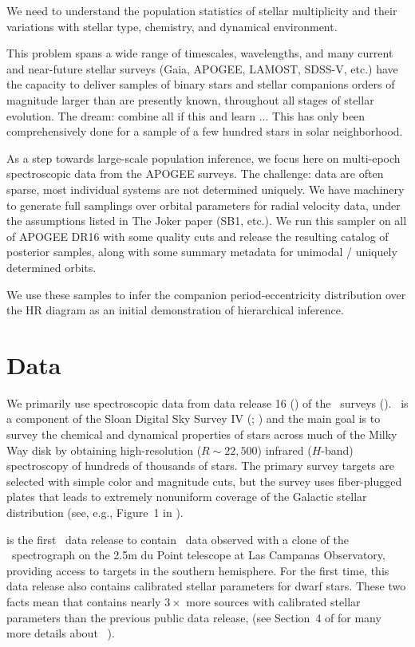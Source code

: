 \documentclass[modern]{aastex62}
\begin{document}
We need to understand the population statistics of stellar multiplicity and their variations with stellar type, chemistry, and dynamical environment.

This problem spans a wide range of timescales, wavelengths, and many current and near-future stellar surveys (Gaia, APOGEE, LAMOST, SDSS-V, etc.) have the capacity to deliver samples of binary stars and stellar companions orders of magnitude larger than are presently known, throughout all stages of stellar evolution.
The dream: combine all if this and learn ...
This has only been comprehensively done for a sample of a few hundred stars in solar neighborhood.

As a step towards large-scale population inference, we focus here on multi-epoch spectroscopic data from the APOGEE surveys.
The challenge: data are often sparse, most individual systems are not determined uniquely.
We have machinery to generate full samplings over orbital parameters for radial velocity data, under the assumptions listed in The Joker paper (SB1, etc.).
We run this sampler on all of APOGEE DR16 with some quality cuts and release the resulting catalog of posterior samples, along with some summary metadata for unimodal / uniquely determined orbits.

We use these samples to infer the companion period-eccentricity distribution over the HR diagram as an initial demonstration of hierarchical inference.


\section{Data} \label{sec:data}

We primarily use spectroscopic data from data release 16 () of the
\apogee\ surveys (\citealt{Majewski:2017, Abolfathi:2017, DR16}).
\apogee\ is a component of the Sloan Digital Sky Survey IV (\sdssiv;
\citealt{Gunn:2006, Blanton:2017}) and the main goal is to survey the chemical
and dynamical properties of stars across much of the Milky Way disk by obtaining
high-resolution ($R \sim 22,500$) infrared ($H$-band) spectroscopy of hundreds
of thousands of stars.
The primary survey targets are selected with simple color and magnitude cuts,
but the survey uses fiber-plugged plates that leads to extremely nonuniform
coverage of the Galactic stellar distribution (see, e.g., Figure~1 in \citealt{DR16}).

 is the first \sdss\ data release to contain \apogee\ data observed with
a clone of the \apogee\ spectrograph on the 2.5m du Point telescope at Las
Campanas Observatory, providing access to targets in the southern hemisphere.
For the first time, this data release also contains calibrated stellar
parameters for dwarf stars.
These two facts mean that  contains nearly $3\times$ more sources with
calibrated stellar parameters than the previous public data release, 
(see Section~4 of \citealt{DR16} for many more details about \apogee\ ).
\end{document}
